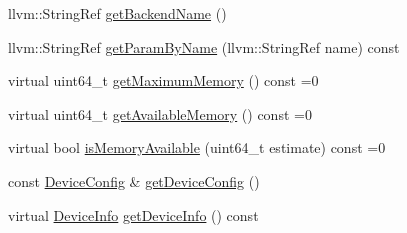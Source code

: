 \begin{DoxyCompactItemize}
llvm\+::\+String\+Ref \hyperlink{classglow_1_1runtime_1_1_device_manager_aa86bf2fba88df94818b1bb5cec5dd2d7}{get\+Backend\+Name} ()
\item 
llvm\+::\+String\+Ref \hyperlink{classglow_1_1runtime_1_1_device_manager_a839a6b19dd88cbfee2c758d92ac4e1e0}{get\+Param\+By\+Name} (llvm\+::\+String\+Ref name) const
\item 
virtual uint64\+\_\+t \hyperlink{classglow_1_1runtime_1_1_device_manager_ad158f1c1f9f32b48927f50d48f80decb}{get\+Maximum\+Memory} () const =0
\item 
virtual uint64\+\_\+t \hyperlink{classglow_1_1runtime_1_1_device_manager_a5a84ac3b23b9b6d72f50d763913ed8aa}{get\+Available\+Memory} () const =0
\item 
virtual bool \hyperlink{classglow_1_1runtime_1_1_device_manager_ae9bba4abda9cb6aa1359a69e942feb22}{is\+Memory\+Available} (uint64\+\_\+t estimate) const =0
\item 
const \hyperlink{structglow_1_1runtime_1_1_device_config}{Device\+Config} \& \hyperlink{classglow_1_1runtime_1_1_device_manager_a70a7ee3ea3c0b27c0d0d934e45b99ca3}{get\+Device\+Config} ()
\item 
virtual \hyperlink{structglow_1_1runtime_1_1_device_info}{Device\+Info} \hyperlink{classglow_1_1runtime_1_1_device_manager_aaf319fc3b9aa67c5e053bdf690e89d34}{get\+Device\+Info} () const
\end{DoxyCompactItemize}
